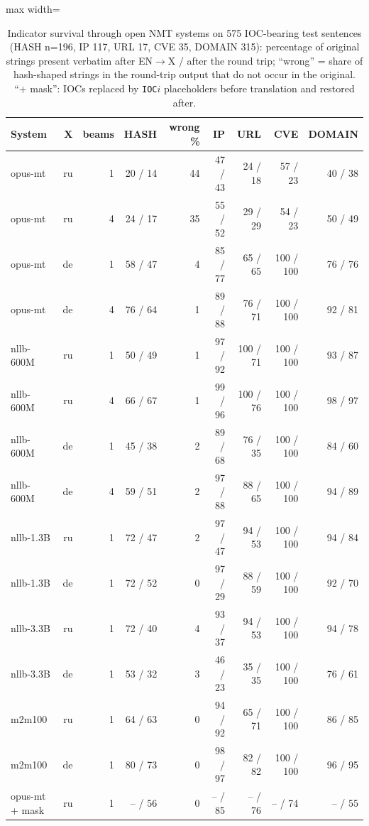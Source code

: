 \begin{table}[t]
\centering
\caption{Indicator survival through open NMT systems on 575 IOC-bearing test sentences (HASH n=196, IP 117, URL 17, CVE 35, DOMAIN 315): percentage of original strings present verbatim after EN$\to$X / after the round trip; ``wrong'' = share of hash-shaped strings in the round-trip output that do not occur in the original. ``+ mask'': IOCs replaced by \texttt{IOC}$i$ placeholders before translation and restored after.}
\label{tab:mtsystems}
\small
\begin{adjustbox}{max width=\textwidth}
\begin{tabular}{lrrrrrrrr}
\toprule
System & X & beams & HASH & wrong \% & IP & URL & CVE & DOMAIN \\
\midrule
opus-mt & ru & 1 & 20 / 14 & 44 & 47 / 43 & 24 / 18 & 57 / 23 & 40 / 38 \\
opus-mt & ru & 4 & 24 / 17 & 35 & 55 / 52 & 29 / 29 & 54 / 23 & 50 / 49 \\
opus-mt & de & 1 & 58 / 47 & 4 & 85 / 77 & 65 / 65 & 100 / 100 & 76 / 76 \\
opus-mt & de & 4 & 76 / 64 & 1 & 89 / 88 & 76 / 71 & 100 / 100 & 92 / 81 \\
nllb-600M & ru & 1 & 50 / 49 & 1 & 97 / 92 & 100 / 71 & 100 / 100 & 93 / 87 \\
nllb-600M & ru & 4 & 66 / 67 & 1 & 99 / 96 & 100 / 76 & 100 / 100 & 98 / 97 \\
nllb-600M & de & 1 & 45 / 38 & 2 & 89 / 68 & 76 / 35 & 100 / 100 & 84 / 60 \\
nllb-600M & de & 4 & 59 / 51 & 2 & 97 / 88 & 88 / 65 & 100 / 100 & 94 / 89 \\
nllb-1.3B & ru & 1 & 72 / 47 & 2 & 97 / 47 & 94 / 53 & 100 / 100 & 94 / 84 \\
nllb-1.3B & de & 1 & 72 / 52 & 0 & 97 / 29 & 88 / 59 & 100 / 100 & 92 / 70 \\
nllb-3.3B & ru & 1 & 72 / 40 & 4 & 93 / 37 & 94 / 53 & 100 / 100 & 94 / 78 \\
nllb-3.3B & de & 1 & 53 / 32 & 3 & 46 / 23 & 35 / 35 & 100 / 100 & 76 / 61 \\
m2m100 & ru & 1 & 64 / 63 & 0 & 94 / 92 & 65 / 71 & 100 / 100 & 86 / 85 \\
m2m100 & de & 1 & 80 / 73 & 0 & 98 / 97 & 82 / 82 & 100 / 100 & 96 / 95 \\
opus-mt + mask & ru & 1 & -- / 56 & 0 & -- / 85 & -- / 76 & -- / 74 & -- / 55 \\

\end{tabular}
\end{adjustbox}
\end{table}
